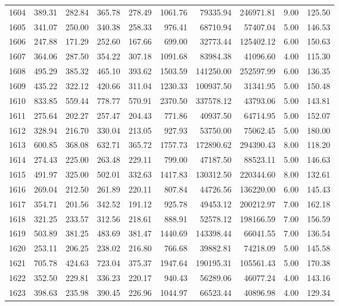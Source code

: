 \begin{tabular}{lrrrrrrrrr}
1604 & 389.31 & 282.84 & 365.78 & 278.49 & 1061.76 & 79335.94 & 246971.81 & 9.00 & 125.50 \\
1605 & 341.07 & 250.00 & 340.38 & 258.33 & 976.41 & 68710.94 & 57407.04 & 5.00 & 146.53 \\
1606 & 247.88 & 171.29 & 252.60 & 167.66 & 699.00 & 32773.44 & 125402.12 & 6.00 & 150.63 \\
1607 & 364.06 & 287.50 & 354.22 & 307.18 & 1091.68 & 83984.38 & 41096.60 & 4.00 & 115.30 \\
1608 & 495.29 & 385.32 & 465.10 & 393.62 & 1503.59 & 141250.00 & 252597.99 & 6.00 & 136.35 \\
1609 & 435.22 & 322.12 & 420.66 & 311.04 & 1230.33 & 100937.50 & 31341.95 & 5.00 & 150.48 \\
1610 & 833.85 & 559.44 & 778.77 & 570.91 & 2370.50 & 337578.12 & 43793.06 & 5.00 & 143.81 \\
1611 & 275.64 & 202.27 & 257.47 & 204.43 & 771.86 & 40937.50 & 64714.95 & 5.00 & 152.07 \\
1612 & 328.94 & 216.70 & 330.04 & 213.05 & 927.93 & 53750.00 & 75062.45 & 5.00 & 180.00 \\
1613 & 600.85 & 368.08 & 632.71 & 365.72 & 1757.73 & 172890.62 & 294390.43 & 8.00 & 118.20 \\
1614 & 274.43 & 225.00 & 263.48 & 229.11 & 799.00 & 47187.50 & 88523.11 & 5.00 & 146.63 \\
1615 & 491.97 & 325.00 & 502.01 & 332.63 & 1417.83 & 130312.50 & 220344.60 & 8.00 & 132.61 \\
1616 & 269.04 & 212.50 & 261.89 & 220.11 & 807.84 & 44726.56 & 136220.00 & 6.00 & 145.43 \\
1617 & 354.71 & 201.56 & 342.52 & 191.12 & 925.78 & 49453.12 & 200212.97 & 7.00 & 162.18 \\
1618 & 321.25 & 233.57 & 312.56 & 218.61 & 888.91 & 52578.12 & 198166.59 & 7.00 & 156.59 \\
1619 & 503.89 & 381.25 & 483.69 & 381.47 & 1440.69 & 143398.44 & 66041.55 & 7.00 & 136.54 \\
1620 & 253.11 & 206.25 & 238.02 & 216.80 & 766.68 & 39882.81 & 74218.09 & 5.00 & 145.58 \\
1621 & 705.78 & 424.63 & 723.04 & 375.37 & 1947.64 & 190195.31 & 105561.43 & 5.00 & 170.38 \\
1622 & 352.50 & 229.81 & 336.23 & 220.17 & 940.43 & 56289.06 & 46077.24 & 4.00 & 143.16 \\
1623 & 398.63 & 235.98 & 390.45 & 226.96 & 1044.97 & 66523.44 & 40896.98 & 4.00 & 129.34 \\

\end{tabular}
